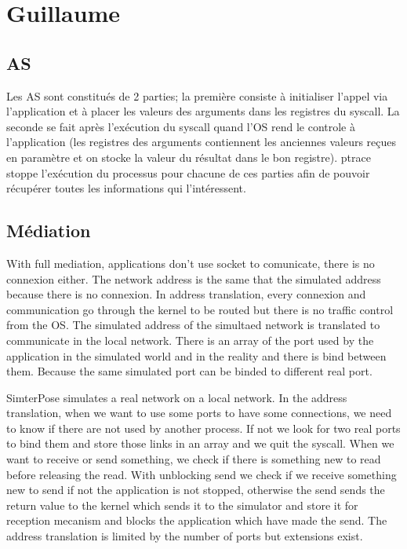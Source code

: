 \documentclass{article}
\begin{document}
\section{Guillaume}
\subsection{AS}
Les AS sont constitués de 2 parties; la première consiste à
initialiser l'appel via l'application et à placer les valeurs des
arguments dans les registres du syscall. La seconde se fait après
l'exécution du syscall quand l'OS rend le controle à l'application
(les registres des arguments contiennent les anciennes valeurs reçues
en paramètre et on stocke la valeur du résultat dans le bon
registre). ptrace stoppe l'exécution du processus pour chacune de ces
parties afin de pouvoir récupérer toutes les informations qui
l'intéressent.

\subsection{Médiation}
With full mediation, applications don't use socket to comunicate,
there is no connexion either. The network address is the same that the
simulated address because there is no connexion.  In address
translation, every connexion and communication go through the kernel
to be routed but there is no traffic control from the OS. The
simulated address of the simultaed network is translated to
communicate in the local network. There is an array of the port used
by the application in the simulated world and in the reality and there
is bind between them. Because the same simulated port can be binded to
different real port.

SimterPose simulates a real network on a local network. In the address
translation, when we want to use some ports to have some connections,
we need to know if there are not used by another process. If not we
look for two real ports to bind them and store those links in an array
and we quit the syscall. When we want to receive or send something, we
check if there is something new to read before releasing the
read. With unblocking send we check if we receive something new to
send if not the application is not stopped, otherwise the send sends
the return value to the kernel which sends it to the simulator and
store it for reception mecanism and blocks the application which have
made the send. The address translation is limited by the number of
ports but extensions exist.
\end{document}
